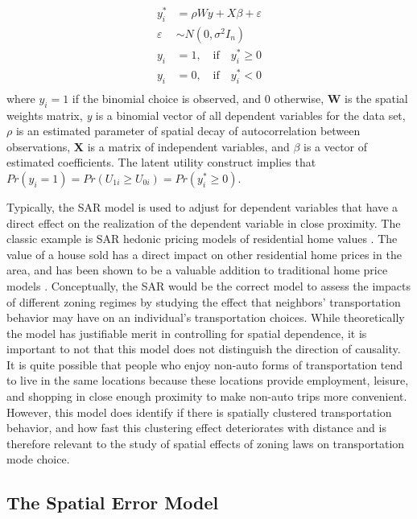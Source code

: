 \begin{equation}
\begin{split}
y^{*}_{i} &= \rho W y + X\beta + \varepsilon \\
\varepsilon & \sim N(0,\sigma^2 I_n)\\
y_i &= 1,\quad \text{if} \quad y^{*}_{i} \geq 0\\
y_i &= 0,\quad  \text{if} \quad  y^{*}_{i} < 0  \\
\end{split}
\end{equation}%
%
where $ y_{i} = 1 $ if the binomial choice is observed, and 0 otherwise,  \textbf{W} is the spatial weights matrix, \textit{y} is a binomial vector of all dependent variables for the data set,  $\rho$ is an estimated parameter of spatial decay of autocorrelation between observations,  \textbf{X} is a matrix of independent variables, and $\beta$ is a vector of estimated coefficients.  The latent utility construct implies that $Pr(y_i=1) = Pr(U_{1i} \geq U_{0i}) = Pr(y^{*}_{i} \geq 0)$.\citep{LeSage2009}

Typically, the SAR model is used to adjust for dependent variables that have a direct effect on the realization of the dependent variable in close proximity.  The classic example is SAR hedonic pricing models of residential home values \cite{pace2004simultaneous}.  The value of a house sold has a direct impact on other residential home prices in the area, and has been shown to be a valuable addition to traditional home price models \citep{Anselin2007}.  Conceptually, the SAR would be the correct model to assess the impacts of different zoning regimes by studying the effect that neighbors' transportation behavior may have on an individual's transportation choices.  While theoretically the model has justifiable merit in controlling for spatial dependence, it is important to not that this model does not distinguish the direction of causality.  It is quite possible that people who enjoy non-auto forms of transportation tend to live in the same locations because these locations provide employment, leisure, and shopping in close enough proximity to make non-auto trips more convenient.  However, this model does identify if there is spatially clustered transportation behavior, and how fast this clustering effect deteriorates with distance and is therefore relevant to the study of spatial effects of zoning laws on transportation mode choice.  

\subsection{The Spatial Error Model}

